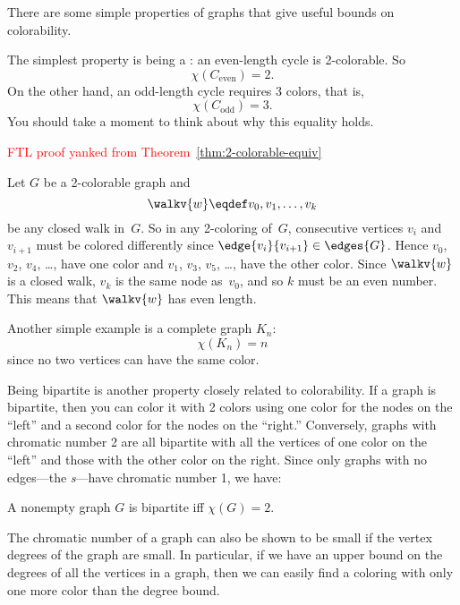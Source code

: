 There are some simple properties of graphs that give useful bounds on
colorability. 

The simplest property is being a : an even-length
cycle is 2-colorable.  So
\[
\chi(C_{\text{even}}) = 2.
\]
On the other hand, an odd-length cycle requires 3 colors, that is,
\begin{equation}\label{Codd3}
\chi(C_{\text{odd}}) = 3.
\end{equation}
You should take a moment to think about why this equality holds.

\begin{editingnotes}
\textcolor{red}{FTL proof yanked from
  Theorem~\ref{thm:2-colorable-equiv}}

Let $G$ be a 2-colorable graph and
\begin{equation*}
    \walkv{w} \eqdef v_0, v_1, \dots, v_k
\end{equation*}
be any closed walk in~$G$.  So in any 2-coloring of~$G$, consecutive
vertices $v_i$ and $v_{i + 1}$ must be colored differently since
$\edge{v_i}{v_{i + 1}} \in \edges{G}$.
Hence $v_0$, $v_2$, $v_4$, \dots, have one color and $v_1$, $v_3$,
$v_5$, \dots, have the other color.  Since $\walkv{w}$ is a closed
walk, $v_k$ is the same node as~$v_0$, and so $k$ must be an even
number.  This means that $\walkv{w}$ has even length.
\end{editingnotes}
Another simple example is a complete graph $K_n$:
\[
\chi(K_n) = n
\]
since no two vertices can have the same color.

Being bipartite is another property closely related to colorability.
If a graph is bipartite, then you can color it with 2 colors using one
color for the nodes on the ``left'' and a second color for the nodes
on the ``right.''  Conversely, graphs with chromatic number 2 are all
bipartite with all the vertices of one color on the ``left'' and those
with the other color on the right.  Since only graphs with no
edges---the \emph{s}---have chromatic number 1, we
have: \iffalse Empty graphs are bipartite as long they have at least
two vertices: a graph with only one vertex is not bipartite because
its vertex set cannot be partitioned into two \emph{nonempty}
subsets.\fi
\begin{lemma}\label{2color-iff-bip}
A nonempty graph $G$ is bipartite iff $\chi(G) = 2$.
\end{lemma}

The chromatic number of a graph can also be shown to be small if the
vertex degrees of the graph are small.  In particular, if we have an
upper bound on the degrees of all the vertices in a graph, then we can
easily find a coloring with only one more color than the degree bound.

